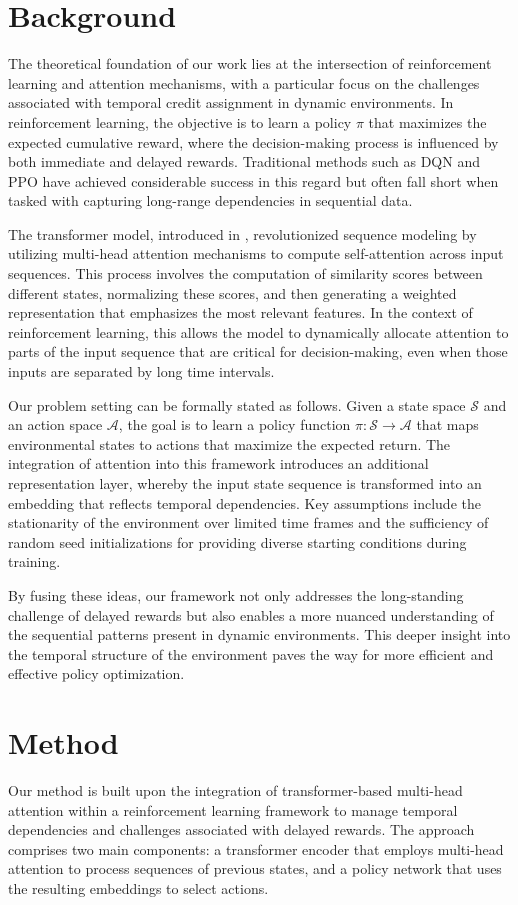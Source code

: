 \documentclass{article}
\begin{document}
\section{Background}
The theoretical foundation of our work lies at the intersection of reinforcement learning and attention mechanisms, with a particular focus on the challenges associated with temporal credit assignment in dynamic environments. In reinforcement learning, the objective is to learn a policy $\pi$ that maximizes the expected cumulative reward, where the decision-making process is influenced by both immediate and delayed rewards. Traditional methods such as DQN and PPO have achieved considerable success in this regard but often fall short when tasked with capturing long-range dependencies in sequential data.

The transformer model, introduced in \cite{ashish_2017_attention}, revolutionized sequence modeling by utilizing multi-head attention mechanisms to compute self-attention across input sequences. This process involves the computation of similarity scores between different states, normalizing these scores, and then generating a weighted representation that emphasizes the most relevant features. In the context of reinforcement learning, this allows the model to dynamically allocate attention to parts of the input sequence that are critical for decision-making, even when those inputs are separated by long time intervals.

Our problem setting can be formally stated as follows. Given a state space $\mathcal{S}$ and an action space $\mathcal{A}$, the goal is to learn a policy function $\pi:\mathcal{S}\rightarrow\mathcal{A}$ that maps environmental states to actions that maximize the expected return. The integration of attention into this framework introduces an additional representation layer, whereby the input state sequence is transformed into an embedding that reflects temporal dependencies. Key assumptions include the stationarity of the environment over limited time frames and the sufficiency of random seed initializations for providing diverse starting conditions during training.

By fusing these ideas, our framework not only addresses the long-standing challenge of delayed rewards but also enables a more nuanced understanding of the sequential patterns present in dynamic environments. This deeper insight into the temporal structure of the environment paves the way for more efficient and effective policy optimization.

\section{Method}
Our method is built upon the integration of transformer-based multi-head attention within a reinforcement learning framework to manage temporal dependencies and challenges associated with delayed rewards. The approach comprises two main components: a transformer encoder that employs multi-head attention to process sequences of previous states, and a policy network that uses the resulting embeddings to select actions.
\end{document}
